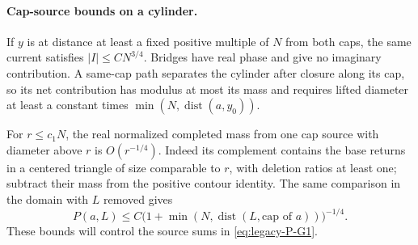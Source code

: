 \paragraph{Cap-source bounds on a cylinder.}
If $y$ is at distance at least a fixed positive multiple of $N$ from both caps, the same current satisfies $|I|\le CN^{3/4}$. Bridges have real phase and give no imaginary contribution. A same-cap path separates the cylinder after closure along its cap, so its net contribution has modulus at most its mass and requires lifted diameter at least a constant times $\min(N,\operatorname{dist}(a,y_0))$.

For $r\le c_1N$, the real normalized completed mass from one cap source with diameter above $r$ is $O(r^{-1/4})$. Indeed its complement contains the base returns in a centered triangle of size comparable to $r$, with deletion ratios at least one; subtract their mass from the positive contour identity. The same comparison in the domain with $L$ removed gives
\begin{equation}\label{eq:cap-first-hit}
 P(a,L)\le C\bigl(1+\min(N,\operatorname{dist}(L,\text{cap of }a))\bigr)^{-1/4}.
\end{equation}
These bounds will control the source sums in \eqref{eq:legacy-P-G1}.

